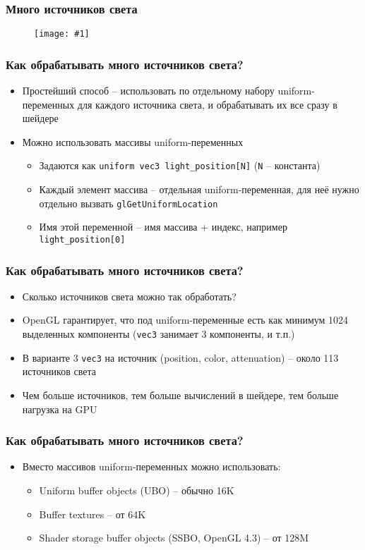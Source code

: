 \documentclass{beamer}
\newcommand{\slideimage}[1]{
  \begin{figure}
    \begin{adjustbox}{width=\textwidth, totalheight=\textheight-2\baselineskip-2\baselineskip,keepaspectratio}
      \texttt{[image: \#1]}
    \end{adjustbox}
  \end{figure}
}
\begin{document}
\begin{frame}[fragile]
\frametitle{Много источников света}
\slideimage{many-lights.png}
\end{frame}

\begin{frame}[fragile]
\frametitle{Как обрабатывать много источников света?}
\begin{itemize}
\item Простейший способ -- использовать по отдельному набору uniform-переменных для каждого источника света, и обрабатывать их все сразу в шейдере
\pause
\item Можно использовать массивы uniform-переменных
\pause
\begin{itemize}
\item Задаются как \verb|uniform vec3 light_position[N]| (\verb|N| -- константа)
\item Каждый элемент массива -- отдельная uniform-переменная, для неё нужно отдельно вызвать \verb|glGetUniformLocation|
\item Имя этой переменной -- имя массива + индекс, например \verb|light_position[0]|
\end{itemize}
\end{itemize}
\end{frame}

\begin{frame}[fragile]
\frametitle{Как обрабатывать много источников света?}
\begin{itemize}
\item Сколько источников света можно так обработать?
\pause
\item OpenGL гарантирует, что под uniform-переменные есть как минимум 1024 выделенных компоненты (\verb|vec3| занимает 3 компоненты, и т.п.)
\pause
\item В варианте 3 \verb|vec3| на источник (position, color, attenuation) -- около 113 источников света
\pause
\item Чем больше источников, тем больше вычислений в шейдере, тем больше нагрузка на GPU
\end{itemize}
\end{frame}

\begin{frame}[fragile]
\frametitle{Как обрабатывать много источников света?}
\begin{itemize}
\item Вместо массивов uniform-переменных можно использовать:
\begin{itemize}
\item Uniform buffer objects (UBO) -- обычно 16K
\item Buffer textures -- от 64K
\item Shader storage buffer objects (SSBO, OpenGL 4.3) -- от 128M
\end{itemize}
\end{itemize}
\end{frame}
\end{document}
